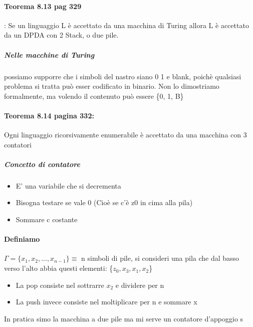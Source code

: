 \documentclass[12pt, a4paper, openany, oneside]{book}
\begin{document}
\paragraph{Teorema 8.13 pag 329}: Se un linguaggio L è accettato da una macchina
di Turing allora L è accettato da un DPDA con 2 Stack, o due pile.
\subparagraph{Nelle macchine di Turing} possiamo supporre che i simboli del nastro
siano 0 1 e blank, poichè qualsiasi problema si tratta può esser codificato in
binario. Non lo dimostriamo formalmente, ma volendo il contenuto può essere \{0, 1, B\}	 
\paragraph{Teorema 8.14 pagina 332: }Ogni linguaggio ricorsivamente enumerabile
è accettato da una macchina con 3 contatori
\subparagraph{Concetto di contatore}
\begin{itemize}
		\item E' una variabile che si decrementa
		\item Bisogna testare se vale 0 (Cioè se c'è z0 in cima alla pila)
		\item Sommare c costante
\end{itemize}	
\paragraph{Definiamo} $\Gamma = \{x_{1}, x_{2}, ..., x_{n-1}\} \equiv$ n simboli
di pile,
si consideri una pila che dal basso verso l'alto abbia questi elementi: \{$z_{0}, x_{3}, x_{1}, x_{2}$\}
\begin{itemize}
	\item La pop consiste nel sottrarre $x_{2}$ e dividere per n
	\item La push invece consiste nel moltiplicare per n e sommare x
\end{itemize}
In pratica simo la macchina a due pile ma mi serve un contatore d'appoggio s
\end{document}
